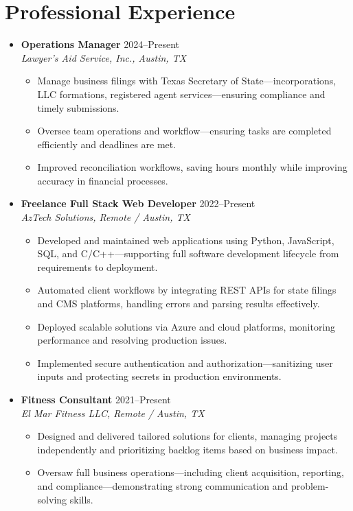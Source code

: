\documentclass[letterpaper,10pt]{article}
\newcommand{\resumeItem}[1]{\item \small{#1}}
\begin{document}
\section*{Professional Experience}
\begin{itemize}
  \item[]
    \textbf{Operations Manager} \hfill 2024--Present \\
    \textit{Lawyer's Aid Service, Inc., Austin, TX}
  \begin{itemize}
    \resumeItem{Manage business filings with Texas Secretary of State---incorporations, LLC formations, registered agent services---ensuring compliance and timely submissions.}
    \resumeItem{Oversee team operations and workflow---ensuring tasks are completed efficiently and deadlines are met.}
    \resumeItem{Improved reconciliation workflows, saving hours monthly while improving accuracy in financial processes.}
  \end{itemize}

  \item[]
    \textbf{Freelance Full Stack Web Developer} \hfill 2022--Present \\
    \textit{AzTech Solutions, Remote / Austin, TX}
  \begin{itemize}
    \resumeItem{Developed and maintained web applications using Python, JavaScript, SQL, and C/C++---supporting full software development lifecycle from requirements to deployment.}
    \resumeItem{Automated client workflows by integrating REST APIs for state filings and CMS platforms, handling errors and parsing results effectively.}
    \resumeItem{Deployed scalable solutions via Azure and cloud platforms, monitoring performance and resolving production issues.}
    \resumeItem{Implemented secure authentication and authorization---sanitizing user inputs and protecting secrets in production environments.}
  \end{itemize}

  \item[]
    \textbf{Fitness Consultant} \hfill 2021--Present \\
    \textit{El Mar Fitness LLC, Remote / Austin, TX}
  \begin{itemize}
    \resumeItem{Designed and delivered tailored solutions for clients, managing projects independently and prioritizing backlog items based on business impact.}
    \resumeItem{Oversaw full business operations---including client acquisition, reporting, and compliance---demonstrating strong communication and problem-solving skills.}
  \end{itemize}
\end{itemize}
\end{document}
